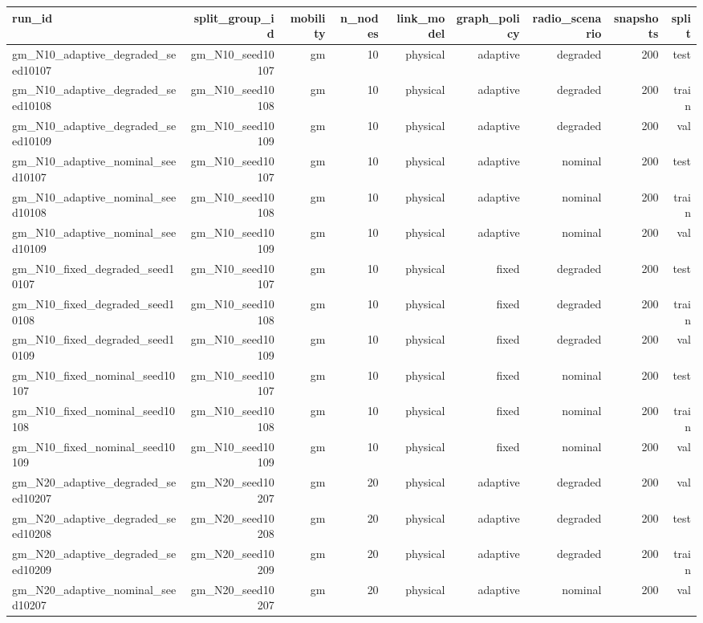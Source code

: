 \begin{tabular}{lrrrrrrrr}
\toprule
run\_id & split\_group\_id & mobility & n\_nodes & link\_model & graph\_policy & radio\_scenario & snapshots & split \\
\midrule
gm\_N10\_adaptive\_degraded\_seed10107 & gm\_N10\_seed10107 & gm & 10 & physical & adaptive & degraded & 200 & test \\
gm\_N10\_adaptive\_degraded\_seed10108 & gm\_N10\_seed10108 & gm & 10 & physical & adaptive & degraded & 200 & train \\
gm\_N10\_adaptive\_degraded\_seed10109 & gm\_N10\_seed10109 & gm & 10 & physical & adaptive & degraded & 200 & val \\
gm\_N10\_adaptive\_nominal\_seed10107 & gm\_N10\_seed10107 & gm & 10 & physical & adaptive & nominal & 200 & test \\
gm\_N10\_adaptive\_nominal\_seed10108 & gm\_N10\_seed10108 & gm & 10 & physical & adaptive & nominal & 200 & train \\
gm\_N10\_adaptive\_nominal\_seed10109 & gm\_N10\_seed10109 & gm & 10 & physical & adaptive & nominal & 200 & val \\
gm\_N10\_fixed\_degraded\_seed10107 & gm\_N10\_seed10107 & gm & 10 & physical & fixed & degraded & 200 & test \\
gm\_N10\_fixed\_degraded\_seed10108 & gm\_N10\_seed10108 & gm & 10 & physical & fixed & degraded & 200 & train \\
gm\_N10\_fixed\_degraded\_seed10109 & gm\_N10\_seed10109 & gm & 10 & physical & fixed & degraded & 200 & val \\
gm\_N10\_fixed\_nominal\_seed10107 & gm\_N10\_seed10107 & gm & 10 & physical & fixed & nominal & 200 & test \\
gm\_N10\_fixed\_nominal\_seed10108 & gm\_N10\_seed10108 & gm & 10 & physical & fixed & nominal & 200 & train \\
gm\_N10\_fixed\_nominal\_seed10109 & gm\_N10\_seed10109 & gm & 10 & physical & fixed & nominal & 200 & val \\
gm\_N20\_adaptive\_degraded\_seed10207 & gm\_N20\_seed10207 & gm & 20 & physical & adaptive & degraded & 200 & val \\
gm\_N20\_adaptive\_degraded\_seed10208 & gm\_N20\_seed10208 & gm & 20 & physical & adaptive & degraded & 200 & test \\
gm\_N20\_adaptive\_degraded\_seed10209 & gm\_N20\_seed10209 & gm & 20 & physical & adaptive & degraded & 200 & train \\
gm\_N20\_adaptive\_nominal\_seed10207 & gm\_N20\_seed10207 & gm & 20 & physical & adaptive & nominal & 200 & val \\

\end{tabular}
